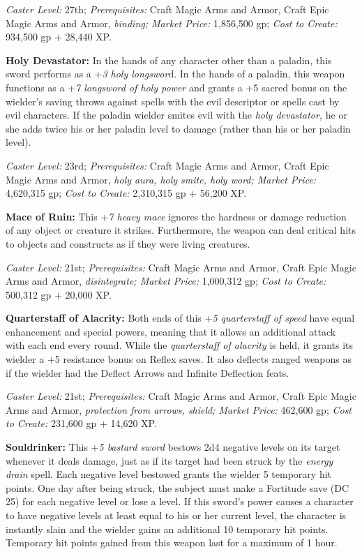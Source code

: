 \documentclass{article}
\begin{document}
\textit{Caster Level: }27th; \textit{Prerequisites: }Craft Magic Arms and Armor, 
Craft Epic Magic Arms and Armor, \textit{binding; Market Price: }1,856,500 gp; 
\textit{Cost to Create: }934,500 gp + 28,440 XP. 

\textbf{Holy Devastator: }In the hands of any character other than a paladin, this 
sword performs as a +\textit{3 holy longswor}d. In the hands of a paladin, this 
weapon functions as a +\textit{7 longsword of holy power }and grants a +5 sacred 
bonus on the wielder's saving throws against spells with the evil descriptor or 
spells cast by evil characters. If the paladin wielder smites evil with the \textit{holy 
devastator, }he or she adds twice his or her paladin level to damage (rather than 
his or her paladin level). 

\textit{Caster Level: }23rd; \textit{Prerequisites: }Craft Magic Arms and Armor, 
Craft Epic Magic Arms and Armor, \textit{holy aura, holy smite, holy word; Market 
Price: }4,620,315 gp; \textit{Cost to Create: }2,310,315 gp + 56,200 XP. 

\textbf{Mace of Ruin: }This +\textit{7 heavy mace }ignores the hardness or damage 
reduction of any object or creature it strikes. Furthermore, the weapon can deal 
critical hits to objects and constructs as if they were living creatures. 

\textit{Caster Level: }21st; \textit{Prerequisites: }Craft Magic Arms and Armor, 
Craft Epic Magic Arms and Armor, \textit{disintegrate; Market Price: }1,000,312 
gp; \textit{Cost to Create: }500,312 gp + 20,000 XP. 

\textbf{Quarterstaff of Alacrity: }Both ends of this +\textit{5 quarterstaff of 
speed }have equal enhancement and special powers, meaning that it allows an additional 
attack with each end every round. While the \textit{quarterstaff of alacrity }is 
held, it grants its wielder a +5 resistance bonus on Reflex saves. It also deflects 
ranged weapons as if the wielder had the Deflect Arrows and Infinite Deflection 
feats. 

\textit{Caster Level: }21st; \textit{Prerequisites: }Craft Magic Arms and Armor, 
Craft Epic Magic Arms and Armor, \textit{protection from arrows, shield; Market 
Price: }462,600 gp; \textit{Cost to Create: }231,600 gp + 14,620 XP. 

\textbf{Souldrinker: }This +\textit{5 bastard sword }bestows 2d4 negative levels 
on its target whenever it deals damage, just as if its target had been struck by 
the \textit{energy drain }spell. Each negative level bestowed grants the wielder 
5 temporary hit points. One day after being struck, the subject must make a Fortitude 
save (DC 25) for each negative level or lose a level. If this sword's power causes 
a character to have negative levels at least equal to his or her current level, 
the character is instantly slain and the wielder gains an additional 10 temporary 
hit points. Temporary hit points gained from this weapon last for a maximum of 
1 hour. 
\end{document}
